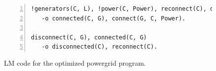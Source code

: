 \begin{figure}[h!]
\begin{Verbatim}[numbers=left,fontsize=\scriptsize,commandchars=*\#\&]
!generators(C, L), !power(C, Power), reconnect(C), disconnected(C), G = nth(L, randint(num-generators))
   -o connected(C, G), connect(G, C, Power).

disconnect(C, G), connected(C, G)
   -o disconnected(C), reconnect(C).
\end{Verbatim}
\caption{LM code for the optimized powergrid program.}
\label{code:threads:powergridt}
\end{figure}

\clearpage
